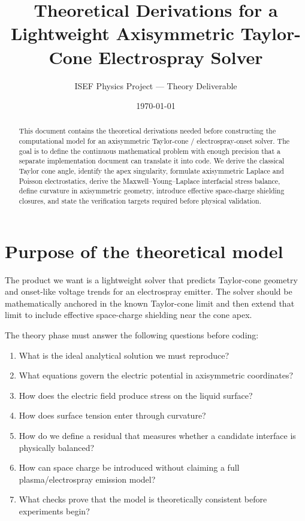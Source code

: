 \documentclass[11pt]{article}
\title{Theoretical Derivations for a Lightweight Axisymmetric Taylor-Cone Electrospray Solver}
\author{ISEF Physics Project --- Theory Deliverable}
\date{\today}
\begin{document}
\maketitle

\begin{abstract}
This document contains the theoretical derivations needed before constructing the computational model for an axisymmetric Taylor-cone / electrospray-onset solver.  The goal is to define the continuous mathematical problem with enough precision that a separate implementation document can translate it into code.  We derive the classical Taylor cone angle, identify the apex singularity, formulate axisymmetric Laplace and Poisson electrostatics, derive the Maxwell--Young--Laplace interfacial stress balance, define curvature in axisymmetric geometry, introduce effective space-charge shielding closures, and state the verification targets required before physical validation.
\end{abstract}

\tableofcontents

\section{Purpose of the theoretical model}

The product we want is a lightweight solver that predicts Taylor-cone geometry and onset-like voltage trends for an electrospray emitter.  The solver should be mathematically anchored in the known Taylor-cone limit and then extend that limit to include effective space-charge shielding near the cone apex.

The theory phase must answer the following questions before coding:
\begin{enumerate}[label=\arabic*.]
    \item What is the ideal analytical solution we must reproduce?
    \item What equations govern the electric potential in axisymmetric coordinates?
    \item How does the electric field produce stress on the liquid surface?
    \item How does surface tension enter through curvature?
    \item How do we define a residual that measures whether a candidate interface is physically balanced?
    \item How can space charge be introduced without claiming a full plasma/electrospray emission model?
    \item What checks prove that the model is theoretically consistent before experiments begin?
\end{enumerate}
\end{document}
